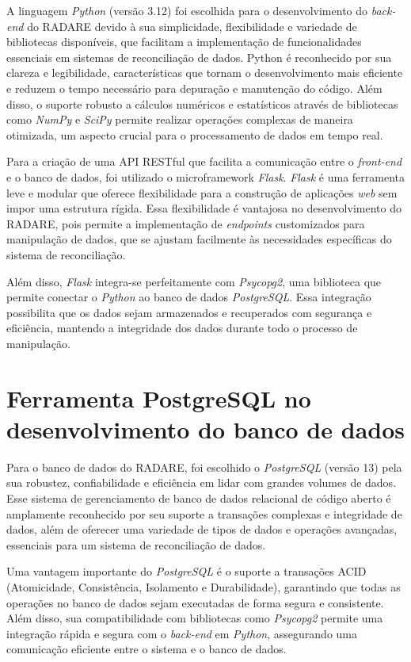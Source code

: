 A linguagem \textit{Python} (versão 3.12) foi escolhida para o desenvolvimento do \textit{back-end} do RADARE devido à sua simplicidade, flexibilidade e variedade de bibliotecas disponíveis, que facilitam a implementação de funcionalidades essenciais em sistemas de reconciliação de dados. Python é reconhecido por sua clareza e legibilidade, características que tornam o desenvolvimento mais eficiente e reduzem o tempo necessário para depuração e manutenção do código. Além disso, o suporte robusto a cálculos numéricos e estatísticos através de bibliotecas como \textit{NumPy} e \textit{SciPy} permite realizar operações complexas de maneira otimizada, um aspecto crucial para o processamento de dados em tempo real.

Para a criação de uma API RESTful que facilita a comunicação entre o \textit{front-end} e o banco de dados, foi utilizado o microframework \textit{Flask}. \textit{Flask} é uma ferramenta leve e modular que oferece flexibilidade para a construção de aplicações \textit{web} sem impor uma estrutura rígida. Essa flexibilidade é vantajosa no desenvolvimento do RADARE, pois permite a implementação de \textit{endpoints} customizados para manipulação de dados, que se ajustam facilmente às necessidades específicas do sistema de reconciliação.

Além disso, \textit{Flask} integra-se perfeitamente com \textit{Psycopg2}, uma biblioteca que permite conectar o \textit{Python} ao banco de dados \textit{PostgreSQL}. Essa integração possibilita que os dados sejam armazenados e recuperados com segurança e eficiência, mantendo a integridade dos dados durante todo o processo de manipulação.

\section{Ferramenta PostgreSQL no desenvolvimento do banco de dados}

Para o banco de dados do RADARE, foi escolhido o \textit{PostgreSQL} (versão 13) pela sua robustez, confiabilidade e eficiência em lidar com grandes volumes de dados. Esse sistema de gerenciamento de banco de dados relacional de código aberto é amplamente reconhecido por seu suporte a transações complexas e integridade de dados, além de oferecer uma variedade de tipos de dados e operações avançadas, essenciais para um sistema de reconciliação de dados.

Uma vantagem importante do \textit{PostgreSQL} é o suporte a transações ACID (Atomicidade, Consistência, Isolamento e Durabilidade), garantindo que todas as operações no banco de dados sejam executadas de forma segura e consistente. Além disso, sua compatibilidade com bibliotecas como \textit{Psycopg2} permite uma integração rápida e segura com o \textit{back-end} em \textit{Python}, assegurando uma comunicação eficiente entre o sistema e o banco de dados.
